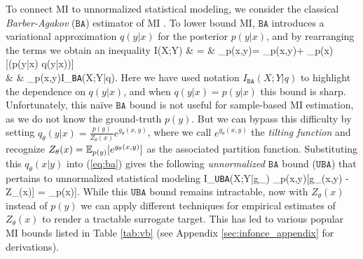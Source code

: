 \documentclass{article}
\theoremstyle{plain}
\theoremstyle{definition}
\theoremstyle{remark}
\newcommand{\BA}{\texttt{BA}}
\newcommand{\UBA}{\texttt{UBA}}
\begin{document}
	To connect MI to unnormalized statistical modeling, we consider the classical {\it Barber-Agakov} ($\BA$) estimator of MI \citep{barber2003information}.  To lower bound MI, $\BA$ introduces a variational approximation $q(y|x)$ for the posterior $p(y|x)$, and by rearranging the terms we obtain an inequality
	\beqs
	I(X;Y) & = & \EE_{p(x,y)} = \EE_{p(x,y)} + \EE_{p(x)}[\KL(p(y|x) \parallel q(y|x))] \nonumber\\
	& \geq & \EE_{p(x,y)}  \triangleq I_{\BA}(X;Y|q). \label{eq:ba}
	\eeqs
	Here we have used notation $I_{\BA}(X;Y|q)$ to highlight the dependence on $q(y|x)$, and when $q(y|x)=p(y|x)$ this bound is sharp. Unfortunately, this na\"ive $\BA$ bound is not useful for sample-based MI estimation, as we do not know the ground-truth $p(y)$. But we can bypass this difficulty by setting $q_{\theta}(y|x) = \frac{p(y)}{Z_{\theta}(x)}e^{g_{\theta}(x,y)}$, where we call $e^{g_{\theta}(x,y)}$ the {\it tilting function} and recognize $Z_{\theta}(x) = \mathbb{E}_{p(y)}[e^{g_{\theta}(x,y)}]$ as the associated partition function. Substituting this $q_{\theta}(x|y)$ into (\ref{eq:ba}) gives the following {\it unnormalized $\BA$} bound ($\UBA$) that pertains to unnormalized statistical modeling \citep{poole2019variational}
	\beq
	\label{eq:uba}
	I_{\UBA}(X;Y|g_{\theta}) \triangleq \EE_{p(x,y)}[g_{\theta}(x,y) - \log Z_{\theta}(x)] = \EE_{p(x)}\left[ \EE_{p(y|x)}\left[  \log \frac{e^{g_{\theta}(x,y)}}{Z_{\theta}(x)}\right]\right].
	\eeq
	While this $\UBA$ bound remains intractable, now with $Z_{\theta}(x)$ instead of $p(y)$ we can apply different techniques for empirical estimates of $Z_{\theta}(x)$ to render a tractable surrogate target. This has led to various popular MI bounds listed in Table \ref{tab:vb} (see Appendix \ref{sec:infonce_appendix} for derivations). 
\end{document}
